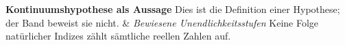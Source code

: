 \begin{BandUebersicht}
\textbf{Kontinuumshypothese als Aussage}
Dies ist die Definition einer Hypothese; der Band beweist sie nicht.
&
\textit{Bewiesene Unendlichkeitsstufen}
Keine Folge natürlicher Indizes zählt sämtliche reellen Zahlen auf.
\\
\end{BandUebersicht}
